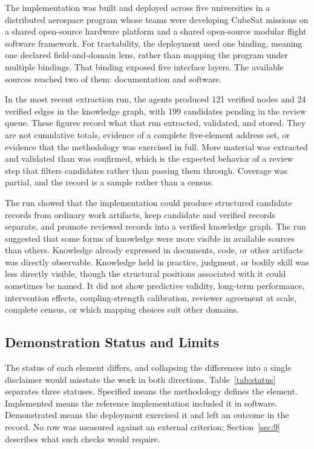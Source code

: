 \documentclass[preprints,article,submit,moreauthors]{Definitions/mdpi}
\begin{document}
The implementation was built and deployed across five universities in a distributed aerospace program whose teams were developing CubeSat missions on a shared open-source hardware platform and a shared open-source modular flight software framework. For tractability, the deployment used one binding, meaning one declared field-and-domain lens, rather than mapping the program under multiple bindings. That binding exposed five interface layers. The available sources reached two of them: documentation and software.

In the most recent extraction run, the agents produced 121 verified nodes and 24 verified edges in the knowledge graph, with 199 candidates pending in the review queue. These figures record what that run extracted, validated, and stored. They are not cumulative totals, evidence of a complete five-element address set, or evidence that the methodology was exercised in full. More material was extracted and validated than was confirmed, which is the expected behavior of a review step that filters candidates rather than passing them through. Coverage was partial, and the record is a sample rather than a census.

The run showed that the implementation could produce structured candidate records from ordinary work artifacts, keep candidate and verified records separate, and promote reviewed records into a verified knowledge graph. The run suggested that some forms of knowledge were more visible in available sources than others. Knowledge already expressed in documents, code, or other artifacts was directly observable. Knowledge held in practice, judgment, or bodily skill was less directly visible, though the structural positions associated with it could sometimes be named. It did not show predictive validity, long-term performance, intervention effects, coupling-strength calibration, reviewer agreement at scale, complete census, or which mapping choices suit other domains.

\subsection{Demonstration Status and Limits}\label{sec:7-3}

The status of each element differs, and collapsing the differences into a single disclaimer would misstate the work in both directions. Table~\ref{tab:status} separates three statuses. Specified means the methodology defines the element. Implemented means the reference implementation included it in software. Demonstrated means the deployment exercised it and left an outcome in the record. No row was measured against an external criterion; Section~\ref{sec:9} describes what such checks would require.
\end{document}
